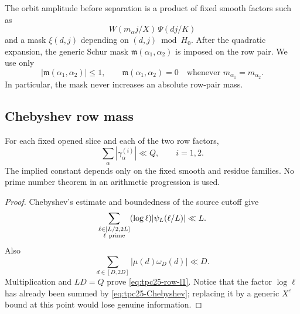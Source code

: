 The orbit amplitude before separation is a product of fixed smooth
factors such as
\begin{equation}
 W(m_\alpha j/X)\,\Psi(dj/K)
 \label{eq:tpc25-one-row-smooth-weight}
\end{equation}
and a mask \(\xi(d,j)\) depending on \((d,j)\bmod H_0\).  After the
quadratic expansion, the generic Schur mask
\(\mathfrak m(\alpha_1,\alpha_2)\) is imposed on the row pair.  We use
only
\begin{equation}
 |\mathfrak m(\alpha_1,\alpha_2)|\le1,
 \qquad
 \mathfrak m(\alpha_1,\alpha_2)=0
 \quad\text{whenever }m_{\alpha_1}=m_{\alpha_2}.
 \label{eq:tpc25-mask-properties}
\end{equation}
In particular, the mask never increases an absolute row-pair mass.

\subsection{Chebyshev row mass}

\begin{lemma}
\label{lem:tpc25-row-l1}
For each fixed opened slice and each of the two row factors,
\begin{equation}
 \boxed{\quad
 \sum_{\alpha}|\gamma_\alpha^{(i)}|\ll Q,
 \qquad i=1,2.
 \quad}
 \label{eq:tpc25-row-l1}
\end{equation}
The implied constant depends only on the fixed smooth and residue
families.  No prime number theorem in an arithmetic progression is
used.
\end{lemma}

\begin{proof}
Chebyshev's estimate and boundedness of the source cutoff give
\begin{equation}
 \sum_{\substack{\ell\in[L/2,2L]\\ \ell\ {\rm prime}}}
 (\log\ell)|\psi_L(\ell/L)|\ll L.
 \label{eq:tpc25-Chebyshev}
\end{equation}
Also
\begin{equation}
 \sum_{d\in[D,2D]}|\mu(d)\omega_D(d)|\ll D.
 \label{eq:tpc25-d-mass}
\end{equation}
Multiplication and \(LD=Q\) prove
\eqref{eq:tpc25-row-l1}.  Notice that the factor \(\log\ell\) has
already been summed by \eqref{eq:tpc25-Chebyshev}; replacing it by a
generic \(X^\varepsilon\) bound at this point would lose genuine
information.
\end{proof}


